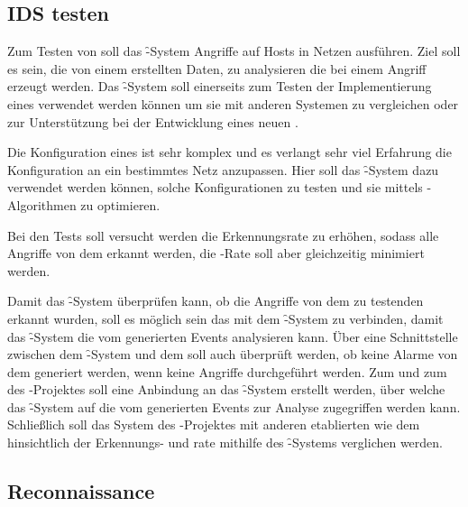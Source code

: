 \subsection{IDS testen}
\label{chp:objectives-functions-idstest}
\authors{\HM}{\BK \and \JF \and \DE \and \LM \and \MW}

Zum Testen von  soll das \f-System  Angriffe auf Hosts in Netzen
ausführen. Ziel soll es sein, die von einem  erstellten Daten, zu
analysieren die bei einem Angriff erzeugt werden. 
Das \f-System soll einerseits zum Testen der Implementierung eines 
verwendet werden können \zB um sie mit anderen Systemen zu vergleichen oder
zur Unterstützung bei der Entwicklung eines neuen .

Die Konfiguration eines  ist sehr komplex und es verlangt sehr viel
Erfahrung die Konfiguration an ein bestimmtes Netz anzupassen.
Hier soll das \f-System dazu verwendet werden können, solche Konfigurationen
zu testen und sie mittels -Algorithmen zu optimieren.

Bei den Tests soll versucht werden die Erkennungsrate zu erhöhen, sodass 
alle Angriffe von dem  erkannt werden, die -Rate
soll aber gleichzeitig minimiert werden.

Damit das \f-System überprüfen kann, ob die Angriffe von dem zu testenden
 erkannt wurden, soll es möglich sein das  mit dem \f-System zu
verbinden, damit das \f-System die vom  generierten Events analysieren kann.
Über eine Schnittstelle zwischen dem \f-System und dem  soll
auch überprüft werden, ob keine Alarme von dem  generiert werden,
wenn keine Angriffe durchgeführt werden.
Zum  und zum  des -Projektes soll eine
Anbindung an das \f-System erstellt werden, über welche das \f-System auf die
vom  generierten Events zur Analyse zugegriffen werden kann.
Schließlich soll das System des -Projektes mit anderen etablierten 
wie dem  hinsichtlich der Erkennungs- und 
rate mithilfe des \f-Systems verglichen werden.

\subsection{Reconnaissance}
\label{chp:objectives-functions-reconnaissance}
\authors{\HM}{\BK \and \JF \and \DE \and \LM}

